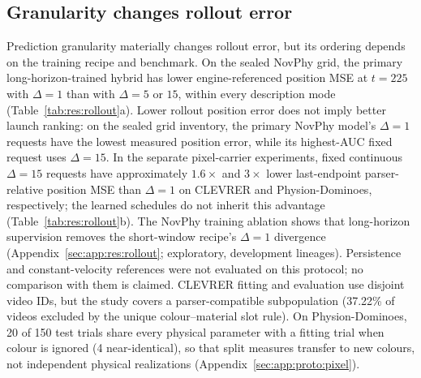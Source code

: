 \subsection{Granularity changes rollout error}
\label{sec:res:rollout}

\begin{revblock}
\nopagebreak
Prediction granularity materially changes rollout error, but its ordering depends on the training recipe and benchmark. On the sealed NovPhy grid, the primary long-horizon-trained hybrid has lower engine-referenced position MSE at $t=225$ with $\Delta=1$ than with $\Delta=5$ or $15$, within every description mode (Table~\ref{tab:res:rollout}a). Lower rollout position error does not imply better launch ranking: on the sealed grid inventory, the primary NovPhy model's $\Delta=1$ requests have the lowest measured position error, while its highest-AUC fixed request uses $\Delta=15$. In the separate pixel-carrier experiments, fixed continuous $\Delta=15$ requests have approximately $1.6\times$ and $3\times$ lower last-endpoint parser-relative position MSE than $\Delta=1$ on CLEVRER and Physion-Dominoes, respectively; the learned schedules do not inherit this advantage (Table~\ref{tab:res:rollout}b). The NovPhy training ablation shows that long-horizon supervision removes the short-window recipe's $\Delta=1$ divergence (Appendix~\ref{sec:app:res:rollout}; exploratory, development lineages). Persistence and constant-velocity references were not evaluated on this protocol; no comparison with them is claimed. CLEVRER fitting and evaluation use disjoint video IDs, but the study covers a parser-compatible subpopulation (37.22\% of videos excluded by the unique colour--material slot rule). On Physion-Dominoes, 20 of 150 test trials share every physical parameter with a fitting trial when colour is ignored (4 near-identical), so that split measures transfer to new colours, not independent physical realizations (Appendix~\ref{sec:app:proto:pixel}).
\end{revblock}

\subsection{\texorpdfstring{}{One shared predictor serves all nine requests}}
\label{sec:res:sharing}

